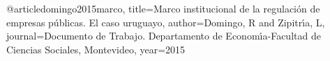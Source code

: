 @article{domingo2015marco,
  title={Marco institucional de la regulaci{\'o}n de empresas p{\'u}blicas. El caso uruguayo},
  author={Domingo, R and Zipitr{\'\i}a, L},
  journal={Documento de Trabajo. Departamento de Econom{\'\i}a-Facultad de Ciencias Sociales, Montevideo},
  year={2015}
}
